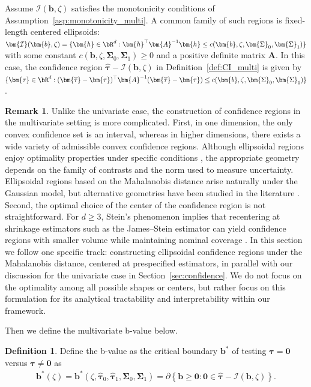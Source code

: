 \documentclass[11pt]{article}
\def\cI{{\mathcal I}}
\newcommand{\htau}{\widehat\tau}
\numberwithin{equation}{section}
\theoremstyle{definition}
\newtheorem{definition}{Definition}[section]
\newtheorem{remark}{Remark}[section]
\begin{document}
Assume $\bm{\cI}(\bm{b},\zeta)$ satisfies the monotonicity conditions of Assumption~\ref{asp:monotonicity_multi}. A common family of such regions is fixed-length centered ellipsoids: $\bm{\cI}(\bm{b}, \zeta) = \{\bm{h} \in \bR^d: \bm{h}^\top \bm{A}^{-1} \bm{h} \le c(\bm{b}, \zeta, \bm{\Sigma}_0, \bm{\Sigma}_1)\}$ with some constant $c(\bm{b}, \zeta, \bm{\Sigma}_0, \bm{\Sigma}_1) \ge 0$ and a positive definite matrix $\bm{A}$. In this case, the confidence region $\bm{\hat\tau}-\bm{\cI}(\bm{b},\zeta)$ in Definition~\ref{def:CI_multi} is given by $\{\bm{\tau} \in \bR^d: (\bm{\htau} - \bm{\tau})^\top \bm{A}^{-1} (\bm{\htau} - \bm{\tau}) \le c(\bm{b}, \zeta, \bm{\Sigma}_0, \bm{\Sigma}_1)\}$.

\begin{remark}
  Unlike the univariate case, the construction of confidence regions in the multivariate setting is more complicated. First, in one dimension, the only convex confidence set is an interval, whereas in higher dimensions, there exists a wide variety of admissible convex confidence regions. Although ellipsoidal regions enjoy optimality properties under specific conditions \citep{stein1962confidence, wald1949statistical}, the appropriate geometry depends on the family of contrasts and the norm used to measure uncertainty. Ellipsoidal regions based on the Mahalanobis distance \citep{hotelling1931generalization} arise naturally under the Gaussian model, but alternative geometries have been studied in the literature \citep{tukey1949comparing,scheffe1953method,vsidak1967rectangular}. Second, the optimal choice of the center of the confidence region is not straightforward. For $d \ge 3$, Stein’s phenomenon implies that recentering at shrinkage estimators such as the James–Stein estimator can yield confidence regions with smaller volume while maintaining nominal coverage \citep{stein1962confidence,hwang1982minimax,berger1985statistical}. In this section we follow one specific track: constructing ellipsoidal confidence regions under the Mahalanobis distance, centered at prespecified estimators, in parallel with our discussion for the univariate case in Section~\ref{sec:confidence}. We do not focus on the optimality among all possible shapes or centers, but rather focus on this formulation for its analytical tractability and interpretability within our framework.
\end{remark}

Then we define the multivariate b-value below.

\begin{definition}\label{def:b_multi}
  Define the b-value as the critical boundary $\bm{b}^*$ of testing $\bm{\tau} = \bm{0}$ versus $\bm{\tau} \neq \bm{0}$ as
  \begin{align}\label{eq:b_multi}
    \bm{b}^*(\zeta) = \bm{b}^*(\zeta, \bm{\htau}_0, \bm{\htau}_1, \bm{\Sigma}_0, \bm{\Sigma}_1) = \partial\left\{\bm{b} \ge \bm{0}: \bm{0} \in \bm{\hat\tau} - \bm{\cI}(\bm{b}, \zeta)\right\}.
  \end{align}
\end{definition}
\end{document}
